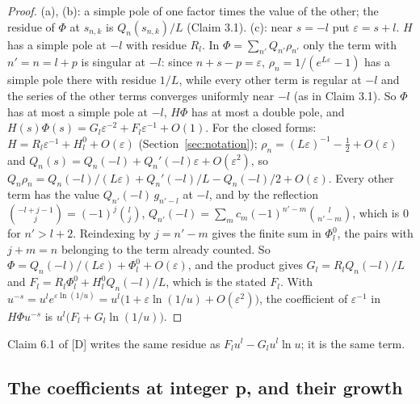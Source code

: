 \documentclass[11pt]{article}
\begin{document}
\begin{proof}
(a), (b): a simple pole of one factor times the value of the other; the residue of $\Phi$ at $s_{n,k}$ is $Q_n(s_{n,k})/L$ (Claim 3.1). (c): near $s=-l$ put $\varepsilon=s+l$. $H$ has a simple pole at $-l$ with residue $R_l$. In $\Phi=\sum_{n'}Q_{n'}\rho_{n'}$ only the term with $n'=n=l+p$ is singular at $-l$: since $n+s-p=\varepsilon$, $\rho_n=1/(e^{L\varepsilon}-1)$ has a simple pole there with residue $1/L$, while every other term is regular at $-l$ and the series of the other terms converges uniformly near $-l$ (as in Claim 3.1). So $\Phi$ has at most a simple pole at $-l$, $H\Phi$ has at most a double pole, and $H(s)\Phi(s)=G_l\varepsilon^{-2}+F_l\varepsilon^{-1}+O(1)$. For the closed forms: $H=R_l\varepsilon^{-1}+H^0_l+O(\varepsilon)$ (Section~\ref{sec:notation}); $\rho_n=(L\varepsilon)^{-1}-\frac12+O(\varepsilon)$ and $Q_n(s)=Q_n(-l)+Q_n'(-l)\varepsilon+O(\varepsilon^2)$, so $Q_n\rho_n=Q_n(-l)/(L\varepsilon)+Q_n'(-l)/L-Q_n(-l)/2+O(\varepsilon)$. Every other term has the value $Q_{n'}(-l)\,g_{n'-l}$ at $-l$, and by the reflection $\binom{-l+j-1}{j}=(-1)^j\binom{l}{j}$, $Q_{n'}(-l)=\sum_mc_m(-1)^{n'-m}\binom{l}{n'-m}$, which is $0$ for $n'>l+2$. Reindexing by $j=n'-m$ gives the finite sum in $\Phi^0_l$, the pairs with $j+m=n$ belonging to the term already counted. So $\Phi=Q_n(-l)/(L\varepsilon)+\Phi^0_l+O(\varepsilon)$, and the product gives $G_l=R_lQ_n(-l)/L$ and $F_l=R_l\Phi^0_l+H^0_lQ_n(-l)/L$, which is the stated $F_l$. With $u^{-s}=u^le^{\varepsilon\ln(1/u)}=u^l\bigl(1+\varepsilon\ln(1/u)+O(\varepsilon^2)\bigr)$, the coefficient of $\varepsilon^{-1}$ in $H\Phi u^{-s}$ is $u^l\bigl(F_l+G_l\ln(1/u)\bigr)$.
\end{proof}

Claim 6.1 of [D] writes the same residue as $F_lu^l-G_lu^l\ln u$; it is the same term.

\subsection{The coefficients at integer p, and their growth}\label{sec:coeff}
\end{document}
